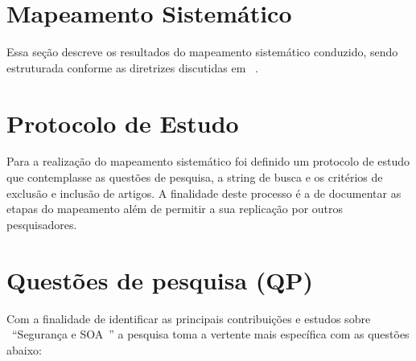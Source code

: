 \section{Mapeamento Sistemático}

Essa seção descreve os resultados do mapeamento sistemático conduzido, sendo estruturada conforme as diretrizes discutidas em ~\cite{Petersen2008}.


\section{Protocolo de Estudo}

Para a realização do mapeamento sistemático foi definido um protocolo de estudo que contemplasse as questões de pesquisa, a string de busca e os critérios de exclusão e inclusão de artigos. A finalidade deste processo é a de documentar as etapas do mapeamento além de permitir a sua replicação por outros pesquisadores.

\section{Questões de pesquisa (QP)}

Com a finalidade de identificar as principais contribuições e estudos sobre  \ ``Segurança e SOA\ '' a pesquisa toma a vertente mais específica com as questões abaixo:

